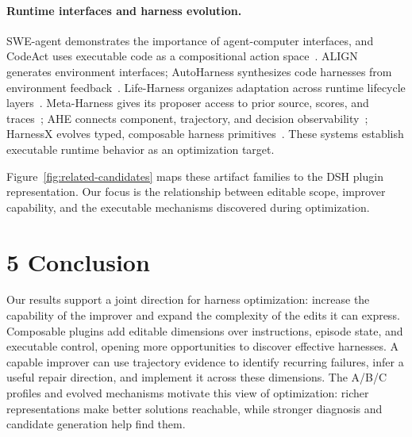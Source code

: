 \documentclass[letterpaper]{article}
\begin{document}
\paragraph{Runtime interfaces and harness evolution.}
SWE-agent demonstrates the importance of agent-computer interfaces, and CodeAct uses executable code as a compositional action space~\citep{sweagent,codeact}. ALIGN generates environment interfaces; AutoHarness synthesizes code harnesses from environment feedback~\citep{align,autoharness}. Life-Harness organizes adaptation across runtime lifecycle layers~\citep{life}. Meta-Harness gives its proposer access to prior source, scores, and traces~\citep{meta}; AHE connects component, trajectory, and decision observability~\citep{ahe}; HarnessX evolves typed, composable harness primitives~\citep{harnessx}. These systems establish executable runtime behavior as an optimization target.

Figure~\ref{fig:related-candidates} maps these artifact families to the DSH plugin representation. Our focus is the relationship between editable scope, improver capability, and the executable mechanisms discovered during optimization.

\FloatBarrier


\FloatBarrier


\section*{5 Conclusion}
Our results support a joint direction for harness optimization: increase the capability of the improver and expand the complexity of the edits it can express. Composable plugins add editable dimensions over instructions, episode state, and executable control, opening more opportunities to discover effective harnesses. A capable improver can use trajectory evidence to identify recurring failures, infer a useful repair direction, and implement it across these dimensions. The A/B/C profiles and evolved mechanisms motivate this view of optimization: richer representations make better solutions reachable, while stronger diagnosis and candidate generation help find them.
\end{document}
